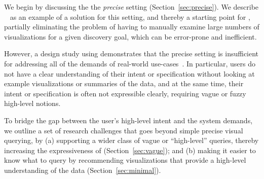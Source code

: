 \par We begin by discussing the 
the {\em precise} setting (Section~\ref{sec:precise}).
We describe \zv~\cite{Siddiqui2016} 
as an example of a solution for
this setting, and thereby a starting point for \vida,
partially eliminating the problem
of having to manually examine large numbers 
of visualizations for a given discovery goal, 
which can be error-prone and inefficient.


\par However, a design study using \zv demonstrates
that the precise setting is insufficient for
addressing all of the demands of real-world use-cases~\cite{Lee2017}.
In particular, users do not have
a clear understanding of their intent or specification 
without looking
at example visualizations or summaries of the data,
and at the same time, their intent or specification is
often not expressible clearly, requiring 
vague or fuzzy high-level notions.

To bridge the gap between the user's high-level
intent and the system demands,
we outline a set of research challenges
that goes beyond simple precise visual querying, by
(a) supporting a wider class of vague or ``high-level''
queries, thereby increasing the expressiveness
of \vida (Section~\ref{sec:vague});
and 
(b) making it easier to know what to query
by recommending visualizations that provide
a high-level understanding of the data (Section~\ref{sec:minimal}).



